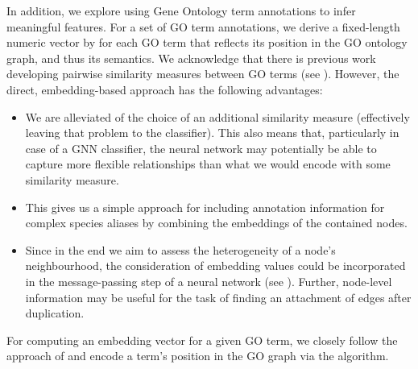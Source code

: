 \documentclass[
	fontsize=10pt, %
	twoside=false, %
	secnumdepth=1, %
  toc=indentunnumbered %
]{kaobook}
\begin{document}
In addition, we explore using Gene Ontology term annotations to infer meaningful
features.
%
For a set of GO term annotations, we derive a fixed-length numeric
 vector by for each GO term that reflects its position in the GO
ontology graph, and thus its semantics. We acknowledge that there is previous
work developing pairwise similarity measures between GO terms (see
). However, the direct, embedding-based approach has
the following advantages:
%
\begin{itemize}
\item We are alleviated of the choice of an additional similarity measure
  (effectively leaving that problem to the classifier). This also means that,
  particularly in case of a GNN classifier, the neural network may potentially
  be able to capture more flexible relationships than what we would encode with
  some similarity measure.
\item This gives us a simple approach for including annotation information for
  complex species aliases by combining the embeddings of the contained nodes.
\item Since in the end we aim to assess the heterogeneity of a node's
  neighbourhood, the consideration of embedding values could be incorporated in
  the message-passing step of a neural network (see ). Further,
  node-level information may be useful for the task of finding an attachment of
  edges after duplication.
\end{itemize}

For computing an embedding vector for a given GO term, we closely follow the
approach of \citeauthor{zhong_GO2VecTransformingGO_2020}
\cite{zhong_GO2VecTransformingGO_2020} and encode a term's position in the GO
graph via the  algorithm.
\end{document}
